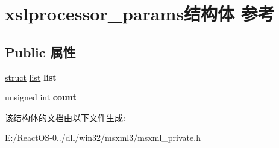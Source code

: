 \hypertarget{structxslprocessor__params}{}\section{xslprocessor\+\_\+params结构体 参考}
\label{structxslprocessor__params}
\subsection*{Public 属性}
\begin{DoxyCompactItemize}
\item 
\mbox{\label{structxslprocessor__params_a46a606b1434b7cb8b8b33bf122908f27}} 
\hyperlink{interfacestruct}{struct} \hyperlink{classlist}{list} {\bfseries list}
\item 
\mbox{\label{structxslprocessor__params_ae2ab7b422106013d3dfd75e35adce697}} 
unsigned int {\bfseries count}
\end{DoxyCompactItemize}


该结构体的文档由以下文件生成\+:\begin{DoxyCompactItemize}
\item 
E\+:/\+React\+O\+S-\/0../dll/win32/msxml3/msxml\+\_\+private.\+h\end{DoxyCompactItemize}
